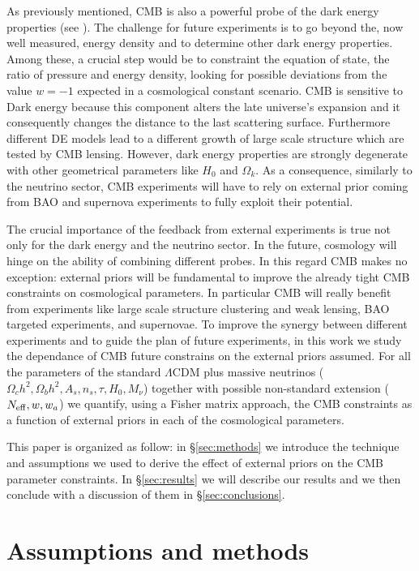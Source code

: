 \documentclass[aps,prd,reprint,superscriptaddress]{revtex4-1}
\newcommand\refsec[1]{\S\ref{sec:#1}}
\begin{document}
As previously mentioned, CMB is also a powerful probe of the dark energy properties (see \cite{2010MNRAS.405.2639J}). The challenge for future experiments is to go beyond the, now well measured, energy density and to determine other dark energy properties.
Among these, a crucial step would be to constraint the equation of state, the ratio of pressure and energy density, looking for possible deviations from the value $w=-1$ expected in a cosmological constant scenario. 
CMB is sensitive to Dark energy because this component alters the late universe's expansion and it consequently changes the distance to the last scattering surface. Furthermore different DE models lead to a different growth of large scale structure which are tested by CMB lensing.
However, dark energy properties are strongly degenerate with other geometrical parameters like $H_{0}$ and $\Omega_{k}$. As a consequence, similarly to the neutrino sector, CMB experiments will have to rely on external prior coming from BAO and supernova experiments to fully exploit their potential.

The crucial importance of the feedback from external experiments is true not only for the dark energy and the neutrino sector. 
In the future, cosmology will hinge on the ability of combining different probes. In this regard CMB makes no exception: external priors will be fundamental to improve the already tight CMB constraints on cosmological parameters. 
In particular CMB will really benefit from experiments like large scale structure clustering and weak lensing, BAO targeted experiments, and supernovae. 
To improve the synergy between different experiments and to guide the plan of future experiments, in this work we study the dependance of CMB future constrains on the external priors assumed. For all the parameters of the standard $\Lambda$CDM plus massive neutrinos ($\Omega_c h^2,\Omega_b h^2,A_s,n_s,\tau,H_0,M_{\nu}$) together with possible non-standard extension ($N_{\rm eff},w,w_{a}$) we quantify, using a Fisher matrix approach, the CMB constraints as a function of external priors in each of the cosmological parameters.   

This paper is organized as follow: in \refsec{methods} we introduce the technique and assumptions we used to derive the effect of external priors on the CMB parameter constraints. In \refsec{results} we will describe our results and we then conclude with a discussion of them in \refsec{conclusions}.



\section{Assumptions and methods \label{sec:methods}}
\end{document}
